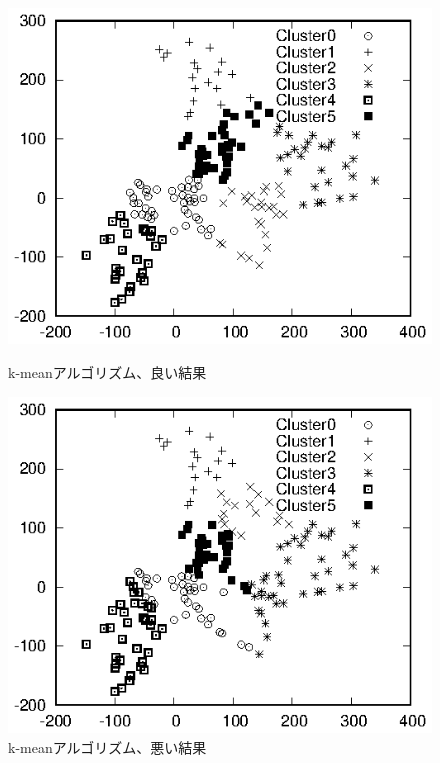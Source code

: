 \documentclass[a4j]{jarticle}
\begin{document}
\begin{figure}[tbp]
 \begin{minipage}{0.5\hsize}
  \begin{center}
   \includegraphics[width=\hsize]{fig/Hokkaido_xyl_seed1.eps}
  \end{center}
  \caption{k-meanアルゴリズム、良い結果}
  \label{fig:k-mean-seed1}
 \end{minipage}
 \begin{minipage}{0.5\hsize}
  \begin{center}
   \includegraphics[width=\hsize]{fig/Hokkaido_xyl_seed4.eps}
  \end{center}
  \caption{k-meanアルゴリズム、悪い結果}
  \label{fig:k-mean-seed4}
 \end{minipage}
\end{figure}
\end{document}
